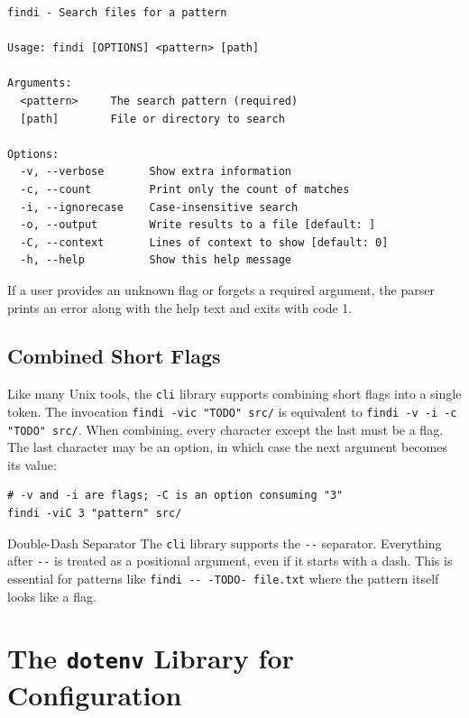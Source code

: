 \begin{lstlisting}[language={}, caption={Auto-generated help output}]
findi - Search files for a pattern

Usage: findi [OPTIONS] <pattern> [path]

Arguments:
  <pattern>     The search pattern (required)
  [path]        File or directory to search

Options:
  -v, --verbose       Show extra information
  -c, --count         Print only the count of matches
  -i, --ignorecase    Case-insensitive search
  -o, --output        Write results to a file [default: ]
  -C, --context       Lines of context to show [default: 0]
  -h, --help          Show this help message
\end{lstlisting}

If a user provides an unknown flag or forgets a required argument, the parser prints an error along with the help text and exits with code 1.

\subsection{Combined Short Flags}\label{sec:cli-combined-flags}


Like many Unix tools, the \lstinline|cli| library supports combining short flags into a single token.
The invocation \texttt{findi -vic "TODO" src/} is equivalent to \texttt{findi -v -i -c "TODO" src/}.
When combining, every character except the last must be a flag.
The last character may be an option, in which case the next argument becomes its value:

\begin{lstlisting}[language={}, caption={Combined flags with a trailing option}]
# -v and -i are flags; -C is an option consuming "3"
findi -viC 3 "pattern" src/
\end{lstlisting}

\begin{tipbox}{Double-Dash Separator}
The \lstinline|cli| library supports the \texttt{-{}-} separator.
Everything after \texttt{-{}-} is treated as a positional argument, even if it starts with a dash.
This is essential for patterns like \texttt{findi -{}- -TODO- file.txt} where the pattern itself looks like a flag.
\end{tipbox}

\section{The \texttt{dotenv} Library for Configuration}\label{sec:dotenv-library}

